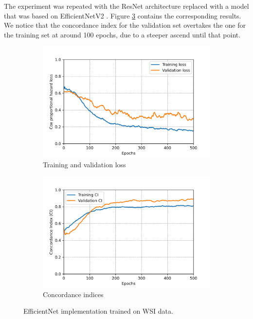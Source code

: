 The experiment was repeated with the ResNet architecture replaced with a model that was based on EfficientNetV2 \cite{Tan2021EfficientNetV2}. Figure \ref{fig:Effnet} contains the corresponding results. We notice that the concordance index for the validation set overtakes the one for the training set at around 100 epochs, due to a steeper ascend until that point. 

\begin{figure}[h!t]
    \centering
     \begin{subfigure}[b]{0.495\textwidth}
         \centering
         \includegraphics[width=\textwidth]{latex/loss_plots/acc12_lr0.01_effnets.png}
         \caption{Training and validation loss}
         \label{fig:effnetloss}
     \end{subfigure}
    \hfill
     \begin{subfigure}[b]{0.495\textwidth}
         \centering
         \includegraphics[width=\textwidth]{latex/ci_plots/acc12_lr0.01_effnets.png}
         \caption{Concordance indices}
         \label{fig:effnetci}
     \end{subfigure}
    \hfill
    \caption[EfficientNet with Single-Layer Prediction]{EfficientNet implementation trained on WSI data.}
    \label{fig:Effnet}
\end{figure}


